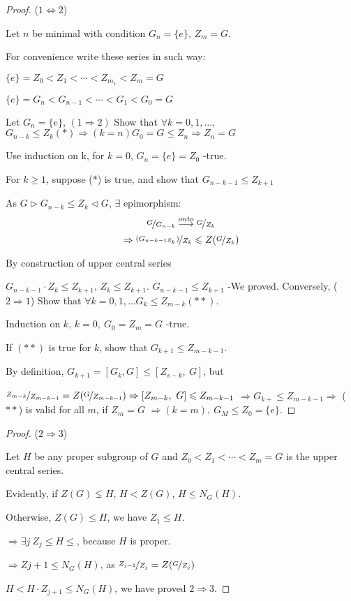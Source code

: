 \documentclass[12pt, a4paper]{article}
\theoremstyle{definition}
\begin{document}
\begin{proof}
    ($1\Leftrightarrow2$) \par
    Let $n$ be minimal with condition $G_n =\{e\}$, $Z_m =G$.
    \par
    For convenience write these series in such way: \par
    $\{e\} = Z_0 <Z_1< \cdots < Z_{m_1} < Z_m  =G $ \par
    $\{e\} = G_n < G_{n-1} < \cdots < G_1 < G_0 = G$ \par
    Let $G_n =\{e\} $, $(1\Rightarrow 2)$ Show that $\forall k =0, 1,\ldots $, 
    $ G_{n-k} \leqslant Z_k (\ast) \Rightarrow (k=n) G_0=G \leqslant Z_n\Rightarrow Z_n=G $
    \par
    Use induction on k, for $k = 0 $, $G_n = \{e\} = Z_0$ -true.
    \par
    For $k\geqslant 1$, suppose ($\ast$) is true, and show that $G_{n-k-1}\leqslant Z_{k+1}$ 
    \par
    As $G\rhd G_{n-k}\leqslant Z_k \lhd G $, $\exists $ epimorphism:
    \[\nicefrac{G}{G_{n-k}} \stackrel{onto}{\longrightarrow} \nicefrac{G}{Z_k} \]
    \[\Rightarrow \nicefrac{(G_{n-k-1Z_k})}{Z_k}\leqslant Z(\nicefrac{G}{Z_k}) \]
    \par
    By construction of upper central series
    \par
    $G_{n-k-1}\cdot Z_k \leqslant Z_{k+1} $, $Z_k \leqslant Z_{k+1} $.
    $G_{n-k-1} \leqslant Z_{k+1} $ -We proved.
    Conversely, ($2\Rightarrow 1 $) Show that $\forall k =0,1,\ldots G_k\leqslant Z_{m-k}
    (\ast \ast)$. 
    \par
    Induction on $k$, $k = 0,\ G_0 = Z_m =G$ -true.
    \par
    If $(\ast \ast)$ is true for $k$, show that $G_{k+1}\leqslant Z_{m-k-1}$.
    \par
    By definition, $G_{k+1} = [G_k, G]\leqslant [Z_{s-k},\ G]$, but \par
    $\nicefrac{Z_{m-k}}{Z_{m-k-1}} = Z(\nicefrac{G}{Z_{m-k-1}})\Rightarrow [Z_{m-k},\ G]
    \leqslant Z_{m-k-1}$ $\Rightarrow G_{k+}\leqslant Z_{m-k-1} \Rightarrow $ ($\ast \ast$)
    is valid for all $m$, if $Z_m = G$ $\Rightarrow (k=m),\ G_M\leqslant Z_0 = \{e\}$.
    \par
\end{proof}
\begin{proof}
    ($2\Rightarrow 3$) \par
    Let $H$ be any proper subgroup of $G$ and $Z_0 < Z_1< \cdots < Z_m = G$ is the upper 
    central series.
    \par
    Evidently, if $Z(G) \lneq H$, $H<Z(G)$, $H\leqslant N_G(H) $.
    \par
    Otherwise, $Z(G)\leqslant H $, we have $Z_1\leqslant H$.
    \par
    $\Rightarrow \exists j\ Z_j \leqslant H\leqslant $, because $H$ is proper.
    \par
    $\Rightarrow Z{j+1}\leqslant N_G(H)$, as $\nicefrac{Z_{j-1}}{Z_j}=Z(\nicefrac{G}{Z_j})$
    \par
    $H<H \cdot Z_{j+1}\leqslant N_G(H)$, we have proved $2\Rightarrow 3$.
    \par
\end{proof}
\end{document}
